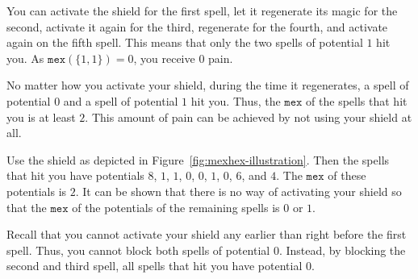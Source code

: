 \nextsample
You can activate the shield for the first spell, let it regenerate its magic for the second, activate it again for the third, regenerate for the fourth, and activate again on the fifth spell.
This means that only the two spells of potential $1$ hit you.
As $\mathtt{mex}(\{1, 1\}) = 0$, you receive $0$ pain.

\nextsample
No matter how you activate your shield, during the time it regenerates, a spell of potential $0$ and a spell of potential $1$ hit you.
Thus, the $\mathtt{mex}$ of the spells that hit you is at least $2$.
This amount of pain can be achieved by not using your shield at all.

\nextsample
Use the shield as depicted in Figure~\ref{fig:mexhex-illustration}.
Then the spells that hit you have potentials $8$, $1$, $1$, $0$, $0$, $1$, $0$, $6$, and $4$.
The $\mathtt{mex}$ of these potentials is $2$.
It can be shown that there is no way of activating your shield so that the $\mathtt{mex}$ of the potentials of the remaining spells is $0$ or $1$.

\nextsample
Recall that you cannot activate your shield any earlier than right before the first spell.
Thus, you cannot block both spells of potential $0$.
Instead, by blocking the second and third spell, all spells that hit you have potential $0$.